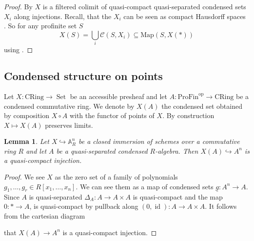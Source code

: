 \documentclass{amsart}
\newtheorem{lem}[prop]{Lemma}
\theoremstyle{definition}
\theoremstyle{remark}
\DeclareMathOperator{\id}{id}
\DeclareMathOperator{\Set}{Set}
\newcommand{\Map}{\mathrm{Map}}
\newcommand{\Cont}{\mathcal{C}}
\begin{document}
\begin{proof} 
    By \cite[Proposition 1.2 (4)]{ScholzeAnalytic} $X$ is a filtered colimit of quasi-compact quasi-separated condensed sets $X_i$ along injections. Recall, that the $X_i$ can be seen as compact Hausdorff spaces \cite[Proposition 1.2 (3)]{ScholzeAnalytic}. So for any profinite set $S$
    $$ X(S) = \bigcup_i \Cont(S, X_i) \subseteq \Map(S, X(*)) $$
    using .
\end{proof}

\subsection{Condensed structure on points}

Let $X : \mathrm{CRing} \to \Set$ be an accessible presheaf and let $A : \mathrm{ProFin}^{\mathrm{op}} \to \mathrm{CRing}$ be a condensed commutative ring.
We denote by $X(A)$ the condensed set obtained by composition $X \circ A$ with the functor of points of $X$.
By construction $X \mapsto X(A)$ preserves limits.

\begin{lem}\label{cl_subscheme_qc_inj}
    Let $X \hookrightarrow \mathbb A^n_R$ be a closed immersion of schemes over a commutative ring $R$ and let $A$ be a quasi-separated condensed $R$-algebra.
    Then $X(A) \hookrightarrow A^n$ is a quasi-compact injection.
\end{lem}

\begin{proof}
    We see $X$ as the zero set of a family of polynomials $g_1, \dots, g_r \in R[x_1, \dots, x_n]$.
    We can see them as a map of condensed sets $\underline g : A^n \to A$.
    Since $A$ is quasi-separated $\Delta_A : A \to A \times A$ is quasi-compact and the map $0 : * \to A$, is quasi-compact by pullback along $(0, \id) : A \to A \times A$.
    It follows from the cartesian diagram
    \begin{center}
    \end{center}
    that $X(A) \to A^n$ is a quasi-compact injection.
\end{proof}



\printunsrtglossary[type=main, style=tree]

\clearpage



\end{document}
